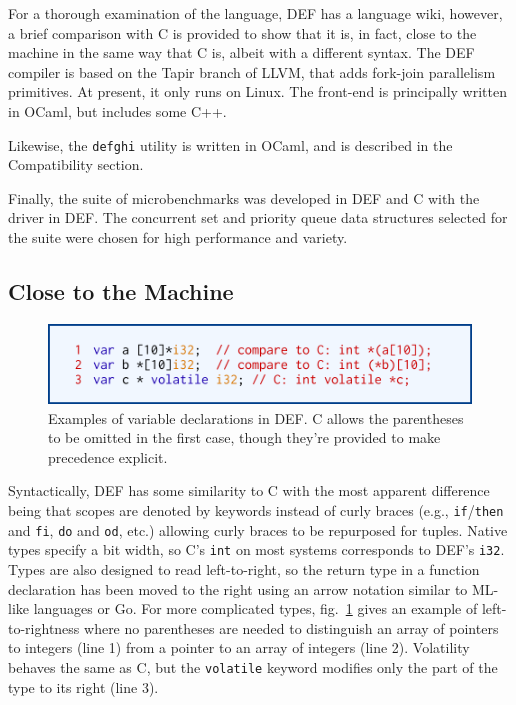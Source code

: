 For a thorough examination of the language, DEF has a language wiki,\cite{DEFWiki} however, a brief comparison with C is provided to show that it is, in fact, close to the machine in the same way that C is, albeit with a different syntax.  The DEF compiler is based on the Tapir branch of LLVM, that adds fork-join parallelism primitives.\cite{TAPIR,LLVM}  At present, it only runs on Linux.  The front-end is principally written in OCaml, but includes some C++.

Likewise, the \texttt{defghi} utility is written in OCaml,\cite{DEF} and is described in the Compatibility section.

Finally, the suite of microbenchmarks was developed in DEF and C with the driver in DEF.  The concurrent set and priority queue data structures selected for the suite were chosen for high performance and variety.

\subsection{Close to the Machine}

\begin{figure}[htbp!]
        \centering
        \includegraphics[scale=0.25]{gfx/types}
        \caption{Examples of variable declarations in DEF.  C allows the parentheses to be omitted in the first case, though they're provided to make precedence explicit.}
        \label{fig:types}
\end{figure}

Syntactically, DEF has some similarity to C with the most apparent difference being that scopes are denoted by keywords instead of curly braces (e.g., \texttt{if}/\texttt{then} and \texttt{fi}, \texttt{do} and \texttt{od}, etc.) allowing curly braces to be repurposed for tuples.  Native types specify a bit width, so C's \texttt{int} on most systems corresponds to DEF's \texttt{i32}.  Types are also designed to read left-to-right, so the return type in a function declaration has been moved to the right using an arrow notation similar to ML-like languages or Go.  For more complicated types, fig.~\ref{fig:types} gives an example of left-to-rightness where no parentheses are needed to distinguish an array of pointers to integers (line 1) from a pointer to an array of integers (line 2).  Volatility behaves the same as C, but the \texttt{volatile} keyword modifies only the part of the type to its right (line 3).

